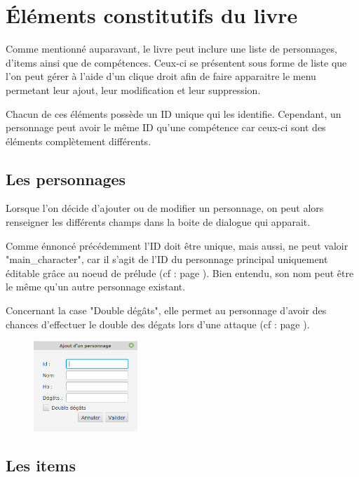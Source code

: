 \chapter{Éléments constitutifs du livre}

	\label{chapter:elementsConstitutifLivre}
	Comme mentionné auparavant, le livre peut inclure une liste de personnages, d'items ainsi que de compétences. Ceux-ci se présentent sous forme de liste que l'on peut gérer à l'aide d'un clique droit afin de faire apparaitre le menu permetant leur ajout, leur modification et leur suppression.

	Chacun de ces éléments possède un ID unique qui les identifie. Cependant, un personnage peut avoir le même ID qu'une compétence car ceux-ci sont des éléments complètement différents.

	\section{Les personnages}

		Lorsque l'on décide d'ajouter ou de modifier un personnage, on peut alors renseigner les différents champs dans la boite de dialogue qui apparait.

		Comme énnoncé précédemment l'ID doit être unique, mais aussi, ne peut valoir "main\_character", car il s'agit de l'ID du personnage principal uniquement éditable grâce au noeud de prélude (cf :  page \pageref{subsec:main_character}). Bien entendu, son nom peut être le même qu'un autre personnage existant.

		Concernant la case "Double dégâts", elle permet au personnage d'avoir des chances d'effectuer le double des dégats lors d'une attaque (cf :  page \pageref{subsubsection:combat}).

		\begin{figure}[H]
			\centering\includegraphics[width=0.35\textwidth, keepaspectratio]{img/personnageDialog.png}
		\end{figure}

	\section{Les items}

